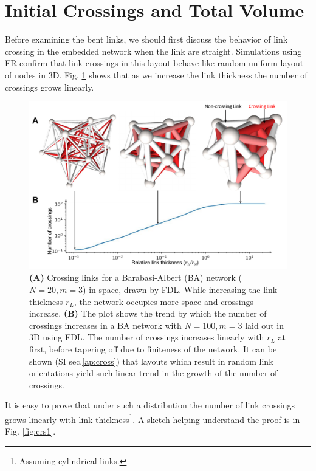 \documentclass[nofootinbib,preprint,floatfix,titlepage,superscriptaddress]{revtex4} %
\begin{document}
\section{Initial Crossings and Total Volume\label{ap:cross}}
Before examining the bent links, we should first discuss the behavior of link crossing in the embedded network when the link are straight. Simulations using FR confirm that link crossings in this layout behave like random uniform layout of nodes in 3D. 
Fig. \ref{fig:crs} shows that as we increase the link thickness the number of crossings grows linearly.
\begin{figure}
    \centering
    \includegraphics[width=.7\columnwidth]{fig-09-19/3D-cross.pdf}
    \caption{\scriptsize
    {\bf (A)}  Crossing links for a Barabasi-Albert (BA) network ($N = 20, m = 3$) in space, drawn by FDL. While increasing the link thickness $r_L$, the network occupies more space and crossings increase. 
    {\bf (B)} The plot shows the trend by which the number of crossings increases in a BA network with $N=100, m =3$ laid out in 3D using FDL.
    The number of crossings increases linearly with $r_L$ at first, before tapering off due to finiteness of the network. It can be shown (SI sec.\ref{ap:cross}) that layouts which result in random link orientations yield such linear trend in the growth of the number of crossings.
    }     
    \label{fig:crs}
\end{figure}
It is easy to prove that under such a distribution the number of link crossings grows linearly with link thickness\footnote{Assuming cylindrical links. %
}. A sketch helping understand the proof is in Fig. \ref{fig:crs1}. 
\end{document}
